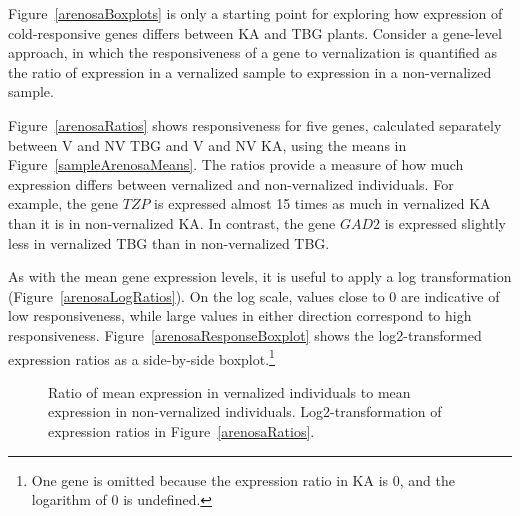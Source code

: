 Figure~\ref{arenosaBoxplots} is only a starting point for exploring how expression of cold-responsive genes differs between KA and TBG plants. Consider a gene-level approach, in which the responsiveness of a gene to vernalization is quantified as the ratio of expression in a vernalized sample to expression in a non-vernalized sample. 

\textD{\newpage}

Figure~\ref{arenosaRatios} shows responsiveness for five genes, calculated separately between V and NV TBG and V and NV KA, using the means in Figure~\ref{sampleArenosaMeans}. The ratios provide a measure of how much expression differs between vernalized and non-vernalized individuals. For example, the gene $TZP$ is expressed almost 15 times as much in vernalized KA than it is in non-vernalized KA. In contrast, the gene $GAD2$ is expressed slightly less in vernalized TBG than in non-vernalized TBG.

As with the mean gene expression levels, it is useful to apply a log transformation (Figure~\ref{arenosaLogRatios}). On the log scale, values close to 0 are indicative of low responsiveness, while large values in either direction correspond to high responsiveness. Figure~\ref{arenosaResponseBoxplot} shows the log2-transformed expression ratios as a side-by-side boxplot.\footnote{One gene is omitted because the expression ratio in KA is 0, and the logarithm of 0 is undefined.}

\begin{figure}[h]
	\centering
	\caption{ Ratio of mean expression in vernalized individuals to mean expression in non-vernalized individuals.  Log2-transformation of expression ratios in Figure~\ref{arenosaRatios}.}
	\label{arenosaRatioTables}
\end{figure}

